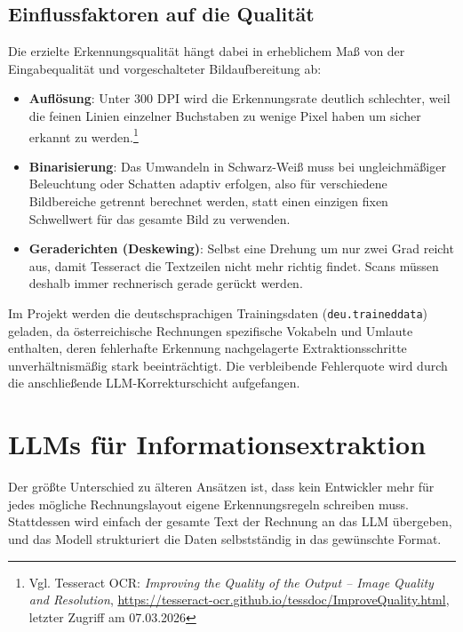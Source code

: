 \subsection{Einflussfaktoren auf die Qualität}
Die erzielte Erkennungsqualität hängt dabei in erheblichem Maß von der Eingabequalität und vorgeschalteter Bildaufbereitung ab:
\begin{itemize}
    \item \textbf{Auflösung}: Unter 300 DPI wird die Erkennungsrate deutlich schlechter, weil die feinen Linien einzelner Buchstaben zu wenige Pixel haben um sicher erkannt zu werden.\footnote{Vgl. Tesseract OCR: \textit{Improving the Quality of the Output -- Image Quality and Resolution}, \url{https://tesseract-ocr.github.io/tessdoc/ImproveQuality.html}, letzter Zugriff am 07.03.2026}
    \item \textbf{Binarisierung}: Das Umwandeln in Schwarz-Weiß muss bei ungleichmäßiger Beleuchtung oder Schatten adaptiv erfolgen, also für verschiedene Bildbereiche getrennt berechnet werden, statt einen einzigen fixen Schwellwert für das gesamte Bild zu verwenden.
    \item \textbf{Geraderichten (Deskewing)}: Selbst eine Drehung um nur zwei Grad reicht aus, damit Tesseract die Textzeilen nicht mehr richtig findet. Scans müssen deshalb immer rechnerisch gerade gerückt werden.
\end{itemize}
Im Projekt werden die deutschsprachigen Trainingsdaten (\texttt{deu.traineddata}) geladen, da österreichische Rechnungen spezifische Vokabeln und Umlaute enthalten, deren fehlerhafte Erkennung nachgelagerte Extraktionsschritte unverhältnismäßig stark beeinträchtigt. Die verbleibende Fehlerquote wird durch die anschließende LLM-Korrekturschicht aufgefangen.

\section{LLMs für Informationsextraktion}
\label{sec:llm_extraction}

Der größte Unterschied zu älteren Ansätzen ist, dass kein Entwickler mehr für jedes mögliche Rechnungslayout eigene Erkennungsregeln schreiben muss. Stattdessen wird einfach der gesamte Text der Rechnung an das LLM übergeben, und das Modell strukturiert die Daten selbstständig in das gewünschte Format.

